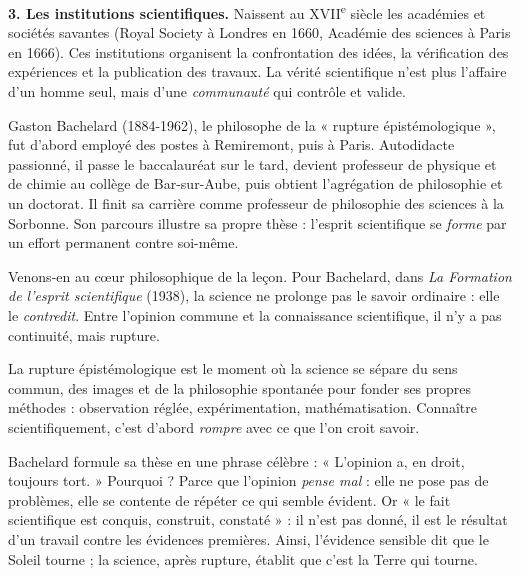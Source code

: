 \documentclass[11pt]{article}
\newcommand{\cle}[1]{{\popxbold\color{popdark}#1}}
\newcounter{popsec}
\newcounter{popsub}
\newcommand{\courssub}[1]{%
  \stepcounter{popsub}%
  \par\vspace{9pt}\noindent{\popxbold\fontsize{11.5}{13}\selectfont\color{popink}{\color{poporange}\thepopsec.\thepopsub}\hspace{6pt}#1}\par\nopagebreak\vspace{4pt}
}
\begin{document}
\textbf{3. Les institutions scientifiques.} Naissent au XVII\textsuperscript{e} siècle les académies et sociétés savantes (Royal Society à Londres en 1660, Académie des sciences à Paris en 1666). Ces institutions organisent la confrontation des idées, la vérification des expériences et la publication des travaux. La vérité scientifique n'est plus l'affaire d'un homme seul, mais d'une \emph{communauté} qui contrôle et valide.

\begin{savaistu}
Gaston Bachelard (1884-1962), le philosophe de la « rupture épistémologique », fut d'abord employé des postes à Remiremont, puis à Paris. Autodidacte passionné, il passe le baccalauréat sur le tard, devient professeur de physique et de chimie au collège de Bar-sur-Aube, puis obtient l'agrégation de philosophie et un doctorat. Il finit sa carrière comme professeur de philosophie des sciences à la Sorbonne. Son parcours illustre sa propre thèse : l'esprit scientifique se \emph{forme} par un effort permanent contre soi-même.
\end{savaistu}

\courssub{Bachelard et la rupture épistémologique}

Venons-en au cœur philosophique de la leçon. Pour Bachelard, dans \emph{La Formation de l'esprit scientifique} (1938), la science ne prolonge pas le savoir ordinaire : elle le \emph{contredit}. Entre l'opinion commune et la connaissance scientifique, il n'y a pas continuité, mais \cle{rupture}.

\begin{definition}
La \cle{rupture épistémologique} est le moment où la science se sépare du sens commun, des images et de la philosophie spontanée pour fonder ses propres méthodes : observation réglée, expérimentation, mathématisation. Connaître scientifiquement, c'est d'abord \emph{rompre} avec ce que l'on croit savoir.
\end{definition}

Bachelard formule sa thèse en une phrase célèbre : « L'opinion a, en droit, toujours tort. » Pourquoi ? Parce que l'opinion \emph{pense mal} : elle ne pose pas de problèmes, elle se contente de répéter ce qui semble évident. Or « le fait scientifique est conquis, construit, constaté » : il n'est pas donné, il est le résultat d'un travail contre les évidences premières. Ainsi, l'évidence sensible dit que le Soleil tourne ; la science, après rupture, établit que c'est la Terre qui tourne.
\end{document}
